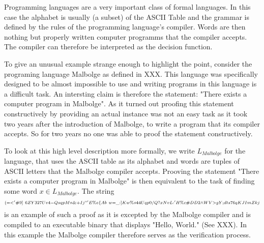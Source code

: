 \begin{example}Programming languages are a very important class of formal languages. In this case the alphabet is usually (a subset) of the ASCII Table and the grammar is defined by the rules of the programming language's compiler. Words are then nothing but properly written computer programms that the compiler accepts. The compiler can therefore be interpreted as the decision function.

To give an unusual example strange enough to highlight the point, consider the programing language Malbolge as defined in XXX. This language was specifically designed to be almost impossible to use and writing programs in this language is a difficult task. An intersting claim is therefore the statement: "There exists a computer program in Malbolge". As it turned out proofing this statement constructively by providing an actual instance was not an easy task as it took two years after the introduction of Malbolge, to write a program that its compiler accepts. So for two years no one was able to proof the statement constructively.

To look at this high level description more formally, we write $L_{Malbolge}$ for the language, that uses the ASCII table as its alphabet and words are tuples of ASCII letters that the Malbolge compiler accepts. Prooving the statement "There exists a computer program in Malbolge" is then equivalent to the task of finding some word $x\in L_{Malbolge}$. The string
$$
\scriptstyle (=<'\#9]~6ZY327Uv4-QsqpMn\&+Ij"'E\%e\{Ab~w=\_:]Kw\%o44Uqp0/Q?xNvL:'H\%c\#DD2\wedge WV>gY;dts76qKJImZkj
$$
is an example of such a proof as it is excepted by the Malbolge compiler and is compiled to an executable binary that displays "Hello, World." (See XXX). In this example the Malbolge compiler therefore serves as the verification process.
\end{example}
